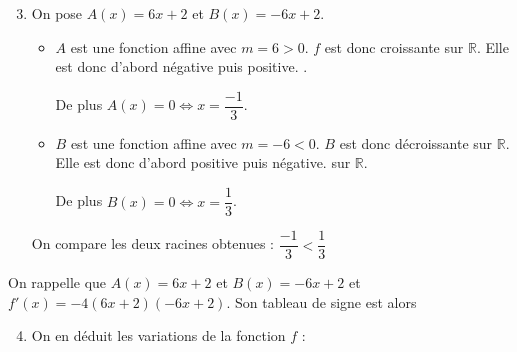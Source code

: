 \documentclass[15pt, mathserif]{beamer}
\begin{document}
 \begin{frame} 
 
 \begin{enumerate} 
 \setcounter{enumi}{2} 
 
 	 \item On pose $A(x)= 6x+2$ et $B(x) = -6x+2$.
 \bigskip 
 \begin{itemize}
	\item $A$ est une fonction affine avec $m =6>0$. $f$ est donc croissante sur $\mathbb{R}$. Elle est donc d'abord négative puis positive. .

	 De plus $A(x) = 0 \Leftrightarrow x = \dfrac{-1}{3}$. 
 \bigskip 
	\item $B$ est une fonction affine avec $m =-6<0$. $B$ est donc décroissante sur $\mathbb{R}$. Elle est donc d'abord positive puis négative. sur $\mathbb{R}$.

	 De plus $B(x) = 0 \Leftrightarrow x = \dfrac{1}{3}$.
\end{itemize}
 On compare les deux racines obtenues : $ \dfrac{-1}{3} < \dfrac{1}{3}$ 
 \end{enumerate} 
 
 \end{frame}


\begin{frame}On rappelle que $A(x) = 6x+2$ et $B(x) = -6x+2$ et $f'(x) = -4(6x+2)(-6x+2)$. Son tableau de signe est alors 

\medskip \hfil
{}

 \begin{enumerate} 
 \setcounter{enumi}{3} 
 	 \item On en déduit les variations de la fonction $f$ : 

  \medskip \hfil
{}

 \end{enumerate} 
 
\end{frame}
\end{document}
